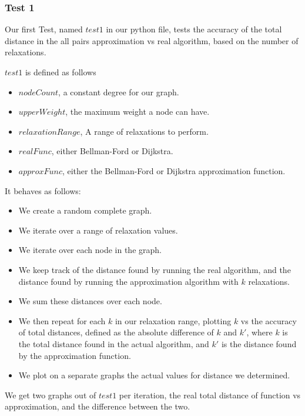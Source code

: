 \documentclass{article}
\begin{document}

\subsubsection{Test 1}

Our first Test, named $test1$ in our python file, tests the accuracy of the total distance in the all pairs approximation vs real algorithm, based on the number of relaxations.

$test1$ is defined as follows
\begin{itemize}
    \item $nodeCount$, a constant degree for our graph.
    \item $upperWeight$, the maximum weight a node can have.
    \item $relaxationRange$, A range of relaxations to perform.
    \item $realFunc$, either Bellman-Ford or Dijkstra.
    \item $approxFunc$, either the Bellman-Ford or Dijkstra approximation function.
\end{itemize}

It behaves as follows:
\begin{itemize}
    \item We create a random complete graph.
    \item We iterate over a range of relaxation values.
    \item We iterate over each node in the graph.
    \item We keep track of the distance found by running the real algorithm, and the distance found by running the approximation algorithm with $k$ relaxations.
    \item We sum these distances over each node.
    \item We then repeat for each $k$ in our relaxation range, plotting $k$ vs the accuracy of total distances, defined as the absolute difference of $k$ and $k'$, where $k$ is the total distance found in the actual algorithm, and $k'$ is the distance found by the approximation function.
    \item We plot on a separate graphs the actual values for distance we determined.
\end{itemize}

We get two graphs out of $test1$ per iteration, the real total distance of function vs approximation, and the difference between the two.
\end{document}
